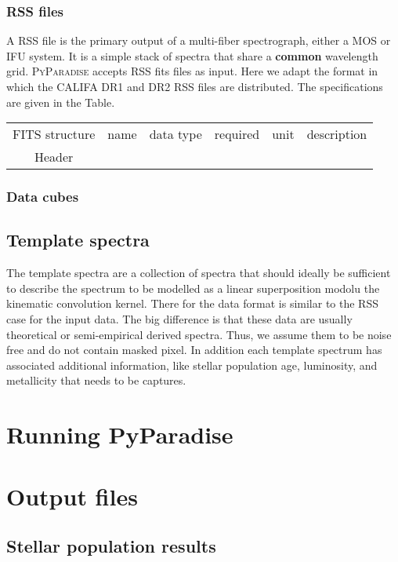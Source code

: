 \documentclass[usenatbib,usegraphicx,useAMS]{mn2e}
\begin{document}
\subsubsection{RSS files}
A RSS file is the primary output of a multi-fiber spectrograph, either a MOS or IFU system. It is a simple stack of spectra that share a \textbf{common} wavelength grid. \textsc{PyParadise} accepts 
RSS fits files as input. Here we adapt the format in which the CALIFA DR1 and DR2 RSS files are distributed. The specifications are given in the Table.

\begin{table*}
\begin{tabular}{cccccc}
FITS structure  & name 		& data type 	& required 	& unit 	& description\\
Header		&		&	        &		&	&	\\
\end{tabular}
 \end{table*}

\subsubsection{Data cubes}

\subsection{Template spectra}
The template spectra are a collection of spectra that should ideally be sufficient to describe the spectrum to be modelled as a linear superposition modolu the kinematic convolution kernel. There for 
the data format is similar to the RSS case for the input data. The big difference is that these data are usually theoretical or semi-empirical derived spectra. Thus, we assume them to be noise 
free and do not contain masked pixel. In addition each template spectrum has associated additional information, like stellar population age, luminosity, and metallicity that needs to be captures. 


\section{Running PyParadise}

\section{Output files}
\subsection{Stellar population results}
\end{document}
